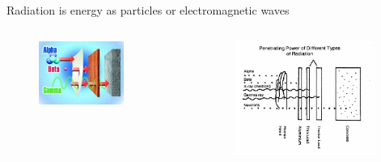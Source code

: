 \documentclass[aspectratio=1610,pdftex,dvipsnames,compress,xcolor={dvipsnames}]{beamer}
\begin{document}
\begin{frame}{Radiation is energy as particles or electromagnetic waves}
    \begin{columns}

        \begin{column}{0.50\textwidth}
            \begin{figure}
                \centering
                \includegraphics[width=0.75\textwidth]{shielding.jpg}
            \end{figure}
        \end{column}

        \begin{column}{0.50\textwidth}
            \begin{figure}
                \centering
                \includegraphics[width=0.95\textwidth]{shielding2.jpg}
            \end{figure}
        \end{column}

    \end{columns}
\end{frame}
\end{document}
